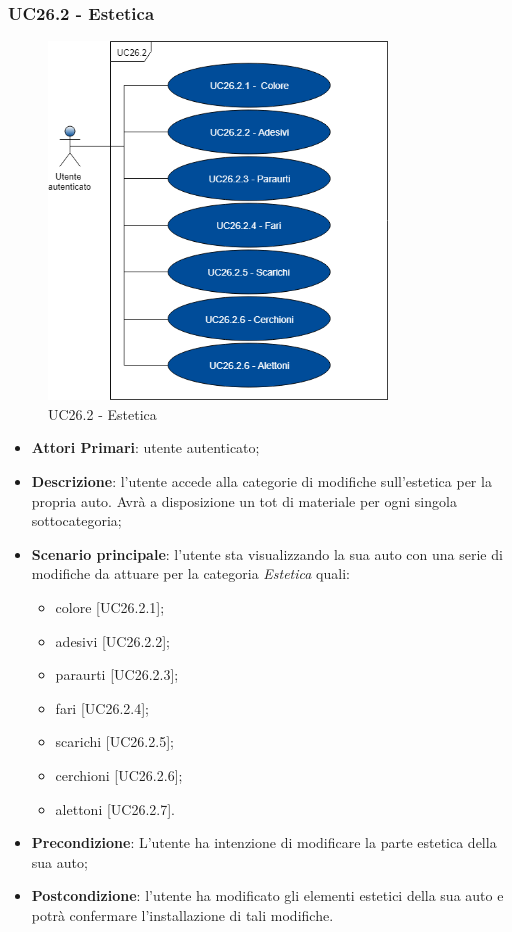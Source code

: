 \subsubsection{UC26.2 - Estetica}
\begin{figure}[h]
	\includegraphics[width=9cm]{res/images/UC26-2Estetica.png}
	\centering
	\caption{UC26.2 - Estetica}
\end{figure}
\begin{itemize}
	\item \textbf{Attori Primari}: utente autenticato;
	\item \textbf{Descrizione}: l'utente accede alla categorie di modifiche sull'estetica per la propria auto. Avrà a disposizione un tot di materiale per ogni singola sottocategoria;
	\item \textbf{Scenario principale}: l'utente sta visualizzando la sua auto con una serie di modifiche da attuare per la categoria \textit{Estetica} quali:
	\begin{itemize}
		\item colore [UC26.2.1];
		\item adesivi [UC26.2.2];
		\item paraurti [UC26.2.3];
		\item fari [UC26.2.4];
		\item scarichi [UC26.2.5];
		\item cerchioni [UC26.2.6];
		\item alettoni [UC26.2.7].
	\end{itemize}
	\item \textbf{Precondizione}: L'utente ha intenzione di modificare la parte estetica della sua auto;
	\item \textbf{Postcondizione}: l'utente ha modificato gli elementi estetici della sua auto e potrà confermare l'installazione di tali modifiche.
\end{itemize}

